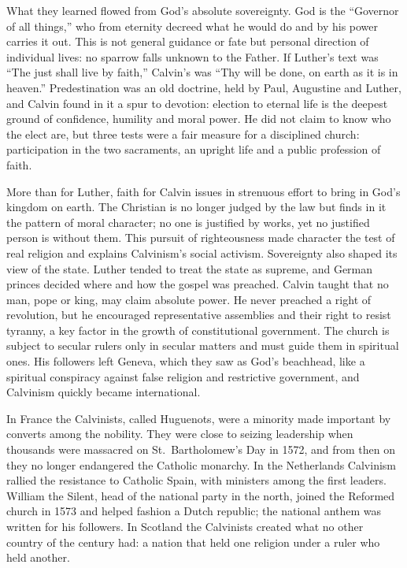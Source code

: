 What they learned flowed from God's absolute sovereignty. God is the ``Governor of all things,'' who
from eternity decreed what he would do and by his power carries it out. This is not general guidance
or fate but personal direction of individual lives: no sparrow falls unknown to the Father. If
Luther's text was ``The just shall live by faith,'' Calvin's was ``Thy will be done, on earth as it
is in heaven.'' Predestination was an old doctrine, held by Paul, Augustine and Luther, and Calvin found in it a spur to devotion: election to eternal life is the deepest ground of confidence, humility and moral
power. He did not claim to know who the elect are, but three tests were a fair measure for a
disciplined church: participation in the two sacraments, an upright life and a public profession of
faith.

More than for Luther, faith for Calvin issues in strenuous effort to bring in God's kingdom on earth.
The Christian is no longer judged by the law but finds in it the pattern of moral character; no one
is justified by works, yet no justified person is without them. This pursuit of righteousness made
character the test of real religion and explains Calvinism's social activism. Sovereignty also shaped
its view of the state. Luther tended to treat the state as supreme, and German princes decided where
and how the gospel was preached. Calvin taught that no man, pope or king, may claim absolute power. He
never preached a right of revolution, but he encouraged representative assemblies and their right to
resist tyranny, a key factor in the growth of constitutional government. The church is subject to
secular rulers only in secular matters and must guide them in spiritual ones. His followers left
Geneva, which they saw as God's beachhead, like a spiritual conspiracy against false religion and
restrictive government, and Calvinism quickly became international.

In France the Calvinists, called Huguenots, were a minority made important by converts among the
nobility. They were close to seizing leadership when thousands were massacred on St.~Bartholomew's
Day in 1572, and from then on they no longer endangered the Catholic monarchy. In the
Netherlands Calvinism rallied the resistance to Catholic Spain, with ministers among the first
leaders. William the Silent, head of the national party in the north, joined the Reformed church in
1573 and helped fashion a Dutch republic; the national anthem was written for his followers. In
Scotland the Calvinists created what no other country of the century had: a nation that held one religion under a ruler who held another.

